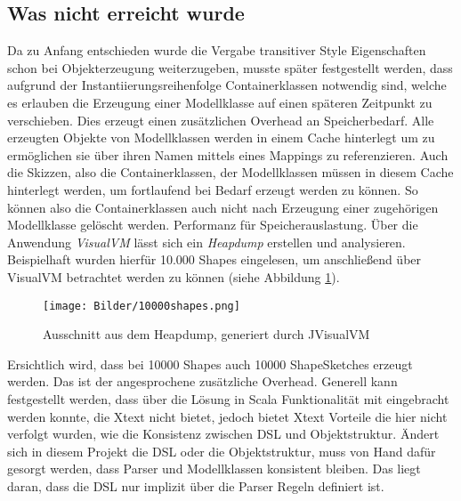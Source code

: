 \subsection{Was nicht erreicht wurde}
Da zu Anfang entschieden wurde die Vergabe transitiver Style Eigenschaften schon bei Objekterzeugung weiterzugeben, musste später festgestellt werden, dass aufgrund der Instantiierungsreihenfolge Containerklassen notwendig sind, welche es erlauben die Erzeugung einer Modellklasse auf einen späteren Zeitpunkt zu verschieben. Dies erzeugt einen zusätzlichen Overhead an Speicherbedarf. Alle erzeugten Objekte von Modellklassen werden in einem Cache hinterlegt um zu ermöglichen sie über ihren Namen mittels eines Mappings zu referenzieren. Auch die Skizzen, also die Containerklassen, der Modellklassen müssen in diesem Cache hinterlegt werden, um fortlaufend bei Bedarf erzeugt werden zu können. So können also die Containerklassen auch nicht nach Erzeugung einer zugehörigen Modellklasse gelöscht werden. Performanz für Speicherauslastung.
Über die Anwendung \textit{VisualVM}  lässt sich ein \textit{Heapdump} erstellen und analysieren. Beispielhaft wurden hierfür 10.000 Shapes eingelesen, um anschließend über VisualVM betrachtet werden zu können (siehe Abbildung \ref{jvisualvm}).
\begin{figure}[h]
	\begin{center}
		\texttt{[image: Bilder/10000shapes.png]}
		\caption{Ausschnitt aus dem Heapdump, generiert durch JVisualVM}
		\label{jvisualvm}
	\end{center}
\end{figure}Ersichtlich wird, dass bei 10000 Shapes auch 10000 ShapeSketches erzeugt werden. Das ist der angesprochene zusätzliche Overhead.
Generell kann festgestellt werden, dass über die Lösung in Scala Funktionalität mit eingebracht werden konnte, die Xtext nicht bietet, jedoch bietet Xtext Vorteile die hier nicht verfolgt wurden, wie die Konsistenz zwischen DSL und Objektstruktur. Ändert sich in diesem Projekt die DSL oder die Objektstruktur, muss von Hand dafür gesorgt werden, dass Parser und Modellklassen konsistent bleiben. Das liegt daran, dass die DSL nur implizit über die Parser Regeln definiert ist.
